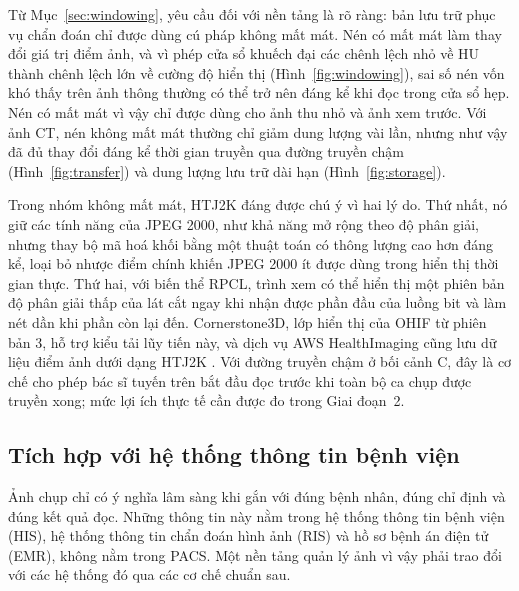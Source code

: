 Từ Mục~\ref{sec:windowing}, yêu cầu đối với nền tảng là rõ ràng: bản lưu trữ phục
vụ chẩn đoán chỉ được dùng cú pháp không mất mát. Nén có mất mát làm thay đổi giá
trị điểm ảnh, và vì phép cửa sổ khuếch đại các chênh lệch nhỏ về HU thành chênh
lệch lớn về cường độ hiển thị (Hình~\ref{fig:windowing}), sai số nén vốn khó thấy
trên ảnh thông thường có thể trở nên đáng kể khi đọc trong cửa sổ hẹp. Nén có mất
mát vì vậy chỉ được dùng cho ảnh thu nhỏ và ảnh xem trước. Với ảnh CT, nén không
mất mát thường chỉ giảm dung lượng vài lần, nhưng như vậy đã đủ thay đổi đáng kể
thời gian truyền qua đường truyền chậm (Hình~\ref{fig:transfer}) và dung lượng
lưu trữ dài hạn (Hình~\ref{fig:storage}).

Trong nhóm không mất mát, HTJ2K \cite{dicomsup235} đáng được chú ý vì hai lý do.
Thứ nhất, nó giữ các tính năng của JPEG 2000, như khả năng mở rộng theo độ phân
giải, nhưng thay bộ mã hoá khối bằng một thuật toán có thông lượng cao hơn đáng
kể, loại bỏ nhược điểm chính khiến JPEG 2000 ít được dùng trong hiển thị thời gian
thực. Thứ hai, với biến thể RPCL, trình xem có thể hiển thị một phiên bản độ phân
giải thấp của lát cắt ngay khi nhận được phần đầu của luồng bit và làm nét dần khi
phần còn lại đến. Cornerstone3D, lớp hiển thị của OHIF từ phiên bản 3, hỗ trợ kiểu
tải lũy tiến này, và dịch vụ AWS HealthImaging cũng lưu dữ liệu điểm ảnh dưới dạng
HTJ2K \cite{awshealthimaging}. Với đường truyền chậm ở bối cảnh C, đây là cơ chế
cho phép bác sĩ tuyến trên bắt đầu đọc trước khi toàn bộ ca chụp được truyền xong;
mức lợi ích thực tế cần được đo trong Giai đoạn~2.

\subsection{Tích hợp với hệ thống thông tin bệnh viện}
\label{sec:his}

Ảnh chụp chỉ có ý nghĩa lâm sàng khi gắn với đúng bệnh nhân, đúng chỉ định và đúng
kết quả đọc. Những thông tin này nằm trong hệ thống thông tin bệnh viện (HIS), hệ
thống thông tin chẩn đoán hình ảnh (RIS) và hồ sơ bệnh án điện tử (EMR), không nằm
trong PACS. Một nền tảng quản lý ảnh vì vậy phải trao đổi với các hệ thống đó qua
các cơ chế chuẩn sau.

